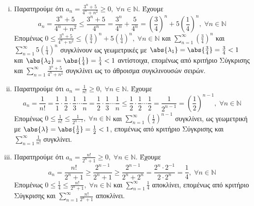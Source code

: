 \begin{enumerate}
\begin{enumerate}[i)]
      \item Παρατηρούμε ότι $ a_{n}= \frac{3^{n}+5}{4^{n}+n^{2}} \geq 0, 
        \; \forall n \in \mathbb{N}$. Έχουμε
        \[
          a_{n} = \frac{3^{n}+5}{4^{n}+n^{2}} \leq \frac{3^{n}+5}{4^{n}} = 
          \frac{3^{n}}{4^{n}} + \frac{5}{4^{n}} = 
          \left(\frac{3}{4}\right)^{n} + 5 \left(\frac{1}{4}\right)^{n} , \; 
          \forall n \in \mathbb{N}
        \] 
        Επομένως $ 0 \leq \frac{3^{n}+5}{4^{n}+n^{2}} \leq 
        \left(\frac{3}{4}\right)^{n} + 5 \left(\frac{1}{4}\right)^{n}, \; 
        \forall n \in \mathbb{N} $ και $ 
        \sum_{n=1}^{\infty} \left(\frac{3}{4} \right)^{n}  $ και $
        \sum_{n=1}^{\infty} 5 \left(\frac{1}{4} \right)^{n} $ 
        συγκλίνουν ως γεωμετρικές με 
        $ \abs{\lambda_{1}} = \abs{\frac{3}{4}} = \frac{3}{4} < 1 $ και 
        $ \abs{\lambda_{2}} = \abs{\frac{1}{4}} = \frac{1}{4} < 1 $ αντίστοιχα, 
        επομένως από κριτήριο Σύγκρισης και 
        $ \sum_{n=1}^{\infty} \frac{3^{n}+5}{4^{n}+n^{2}} $ 
        συγκλίνει ως το άθροισμα συγκλινουσών σειρών.

      \item Παρατηρούμε ότι $ a_{n} = \frac{1}{n!} \geq 0, \; \forall n \in 
        \mathbb{N} $. Έχουμε 
        \[
          a_{n}= \frac{1}{n!} = \frac{1}{1} \cdot \frac{1}{2} \cdot 
          \frac{1}{3} \cdots
          \frac{1}{n} = \frac{1}{2} \cdot \frac{1}{3} \cdots \frac{1}{n} \leq 
          \frac{1}{2} \cdot \frac{1}{2} \cdots \frac{1}{2} = \frac{1}{2^{n-1}} = 
          \left(\frac{1}{2} \right)^{n-1}, 
          \; \forall n \in \mathbb{N} 
        \] 
        Επομένως $ 0 \leq \frac{1}{n!} \leq \frac{1}{2^{n-1}}, \; \forall n \in 
        \mathbb{N} $ και $ \sum_{n=1}^{\infty} \left(\frac{1}{2} \right)^{n-1}  $ 
        συγκλίνει, ως γεωμετρική με $ \abs{\lambda} = \abs{\frac{1}{2}} = 
        \frac{1}{2} < 1 $, επομένως από κριτήριο Σύγκρισης και 
        $ \sum_{n=1}^{\infty} \frac{1}{n!} $ συγκλίνει.

      \item Παρατηρούμε ότι $ a_{n}= \frac{n!}{2^{n}+1} \geq 0, \; 
        \forall n \in \mathbb{N} $.  Έχουμε 
        \[
          a_{n} = \frac{n!}{2^{n}+1} \geq \frac{2^{n-1}}{2^{n}+1} \geq 
          \frac{2^{n-1}}{2^{n}+2^{n}} = 
          \frac{2^{n}\cdot 2^{-1}}{2\cdot 2^{n}} = \frac{1}{4}, 
          \; \forall n \in \mathbb{N}
        \] 
        Επομένως $ 0 \leq \frac{1}{4} \leq \frac{n!}{2^{n}+1}, \; 
        \forall n \in \mathbb{N}
        $ και $ \sum_{n=1}^{\infty} \frac{1}{4} $ αποκλίνει, επομένως από 
        κριτήριο Σύγκρισης και $ \sum_{n=1}^{\infty} \frac{n!}{2^{n}+1} $ 
        αποκλίνει.


\end{enumerate}
\end{enumerate}

